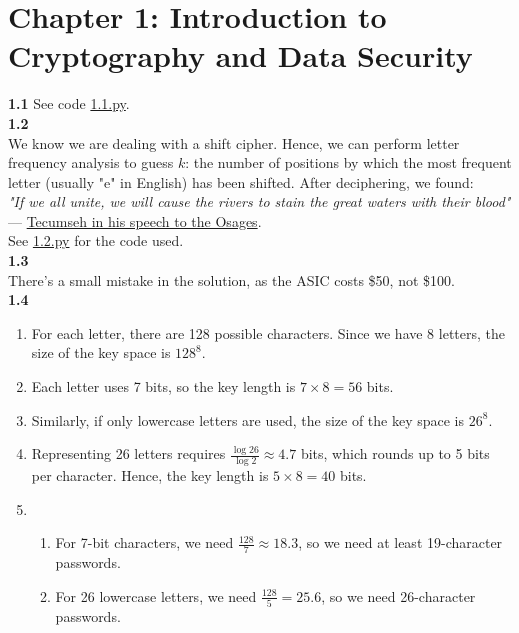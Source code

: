 
\section{Chapter 1: Introduction to Cryptography and Data Security}

\textbf{1.1} See code \href{https://github.com/Ahpatsum15/Understanding-cryptography-solution-handbook-even-numbered/blob/main/chapter%201/1.1.py}{1.1.py}. \\

\textbf{1.2} \\
We know we are dealing with a shift cipher. Hence, we can perform letter frequency analysis to guess $k$: the number of positions by which the most frequent letter (usually "e" in English) has been shifted. After deciphering, we found: \\
\textit{"If we all unite, we will cause the rivers to stain the great waters with their blood"} — \href{http://hiaw.org/defcon1/tecumosages.html}{Tecumseh in his speech to the Osages}. \\
See \href{https://github.com/Ahpatsum15/Understanding-cryptography-solution-handbook-even-numbered/blob/main/chapter%201/1.2.py}{1.2.py} for the code used. \\

\textbf{1.3} \\
There's a small mistake in the solution, as the ASIC costs \$50, not \$100. \\

\textbf{1.4}
\begin{enumerate}
    \item For each letter, there are 128 possible characters. Since we have 8 letters, the size of the key space is $128^8$.
    \item Each letter uses 7 bits, so the key length is $7 \times 8 = 56$ bits.
    \item Similarly, if only lowercase letters are used, the size of the key space is $26^8$.
    \item Representing 26 letters requires $\frac{\log 26}{\log 2} \approx 4.7$ bits, which rounds up to 5 bits per character. Hence, the key length is $5 \times 8 = 40$ bits.
    \item 
    \begin{enumerate}
        \item For 7-bit characters, we need $\frac{128}{7} \approx 18.3$, so we need at least 19-character passwords.
        \item For 26 lowercase letters, we need $\frac{128}{5} = 25.6$, so we need 26-character passwords.
    \end{enumerate}
\end{enumerate}

